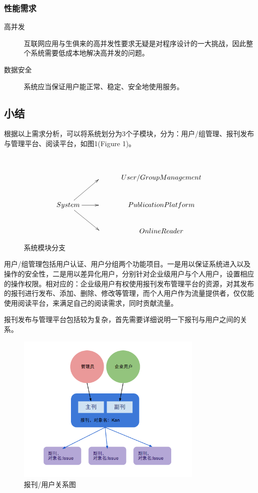 \subsubsection{性能需求}
\begin{description}
	\item[高并发] 互联网应用与生俱来的高并发性要求无疑是对程序设计的一大挑战，因此整个系统需要低成本地解决高并发的问题。
	\item[数据安全] 系统应当保证用户能正常、稳定、安全地使用服务。
\end{description}

\subsection{小结}
根据以上需求分析，可以将系统划分为3个子模块，分为：用户/组管理、报刊发布与管理平台、阅读平台，如图1(Figure 1)。
\par~

\begin{figure}[h]
\begin{displaymath}
	\xymatrix{
	  			 && User/Group Management \\
	  System \ar[ur] \ar[r] \ar[dr] && Publication Platform \\
	  			 && Online Reader }
\end{displaymath}
\caption{系统模块分支}
\end{figure}

用户/组管理包括用户认证、用户分组两个功能项目。一是用以保证系统进入以及操作的安全性，二是用以差异化用户，分别针对企业级用户与个人用户，设置相应的操作权限。相对应的：企业级用户有权使用报刊发布管理平台的资源，对其发布的报刊进行发布、添加、删除、修改等管理，而个人用户作为流量提供者，仅仅能使用阅读平台，来满足自己的阅读需求，同时贡献流量。
\par

报刊发布与管理平台包括较为复杂，首先需要详细说明一下报刊与用户之间的关系。 \clearpage

\begin{figure}[t]
	\centering
		\includegraphics[width=0.8\textwidth]{./images/chap1-1.png}
	\caption{报刊/用户关系图}
\end{figure}

